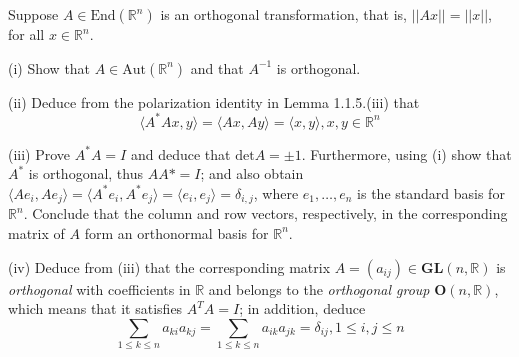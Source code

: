\begin{exercise}{4}
    Suppose $A \in \text{End}(\mathbb{R}^n)$ is an orthogonal transformation, that is, $\lvert \lvert Ax \rvert \rvert = \lvert \lvert x \rvert \rvert$, for all $x \in \mathbb{R}^n$.

    (i) Show that $A \in \text{Aut}(\mathbb{R}^n)$ and that $A^{-1}$ is orthogonal.

    (ii) Deduce from the polarization identity in Lemma 1.1.5.(iii) that
    $$\langle A^*Ax, y \rangle = \langle Ax, Ay \rangle = \langle x, y \rangle, x, y \in \mathbb{R}^n$$

    (iii) Prove $A^*A = I$ and deduce that $\text{det} A = \pm 1$. Furthermore, using (i) show that $A^*$ is orthogonal, thus $AA* = I$; and also obtain $\langle Ae_i, Ae_j \rangle = \langle A^*e_i, A^*e_j \rangle = \langle e_i, e_j \rangle = \delta_{i, j}$, where $e_1, \ldots, e_n$ is the standard basis for $\mathbb{R}^n$. Conclude that the column and row vectors, respectively, in the corresponding matrix of $A$ form an orthonormal basis for $\mathbb{R}^n$.

    (iv) Deduce from (iii) that the corresponding matrix $A = (a_{ij}) \in \textbf{GL}(n, \mathbb{R})$ is \textit{orthogonal} with coefficients in $\mathbb{R}$ and belongs to the \textit{orthogonal group} $\textbf{O}(n, \mathbb{R})$, which means that it satisfies $A^TA = I$; in addition, deduce
    $$\sum_{1 \leq k \leq n} a_{ki}a_{kj} = \sum_{1 \leq k \leq n}a_{ik}a_{jk} = \delta_{ij}, 1 \leq i, j \leq n$$
\end{exercise}

